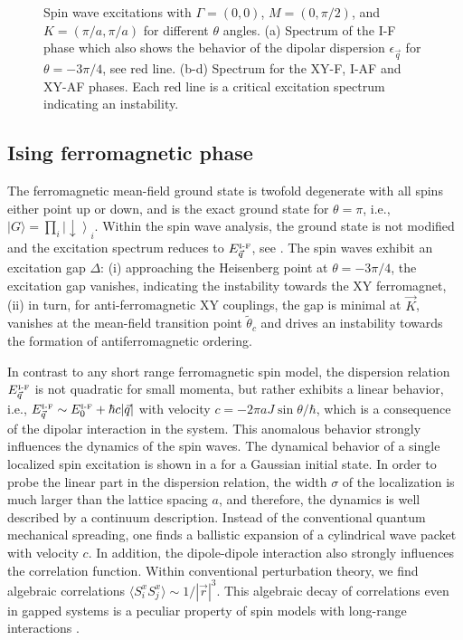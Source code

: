 \begin{figure}[ht]
    \centering
    \caption{Spin wave excitations with $\Gamma=(0,0)$, $M=(0,\pi/2)$, and $K=(\pi/a,\pi/a)$ for different $\theta$ angles. (a) Spectrum of the I-F phase which also shows the behavior of the dipolar dispersion $\epsilon_{\vec q}$ for $\theta=-3\pi/4$, see red line. (b-d) Spectrum for the XY-F, I-AF and XY-AF phases. Each red line is a critical excitation spectrum indicating an instability.}
\end{figure}



\subsection{Ising ferromagnetic phase}
The ferromagnetic mean-field ground state is twofold degenerate with all spins
either point up or down, and is the exact ground state for $\theta =
\pi$, i.e., $|G\rangle = \prod_{i} \left|\downarrow \right\rangle_{i}$. Within the spin wave analysis,
the ground state is not modified and the excitation
spectrum reduces to $E_{{\vec q}}^{\mbox{\tiny I-F}}$, see .
The spin waves exhibit an excitation gap $\Delta$: (i) approaching the
Heisenberg point at $\theta = -3 \pi /4$, the excitation gap
vanishes, indicating the instability towards the XY ferromagnet, (ii) in
turn, for anti-ferromagnetic XY couplings, the gap is minimal at ${\vec K}$,
vanishes at the mean-field transition point $\tilde{\theta}_{c}$ and drives an instability towards the formation
of antiferromagnetic ordering.

In contrast to any short range ferromagnetic spin model, the
dispersion relation $E_{{\vec q}}^{\mbox{\tiny I-F}}$ is not quadratic for small momenta,
but rather exhibits a linear behavior, i.e., $E_{{\vec q}}^{\mbox{\tiny I-F}} \sim E_{0}^{\mbox{\tiny I-F}}+ \hbar c |{\vec q}|$ with
velocity $c= - 2 \pi a J \sin \theta /\hbar$, which is a consequence of the dipolar interaction in
the system. This anomalous behavior strongly influences the dynamics
of the spin waves.
The dynamical behavior of a single localized spin excitation is shown in a for a Gaussian initial state.
In order to probe the linear part in the dispersion relation, the width $\sigma$
of the localization is much larger than the lattice spacing $a$, and therefore, the dynamics is
well described by a continuum description.
Instead of the conventional quantum mechanical spreading, one finds
a ballistic expansion of a cylindrical wave packet with velocity $c$.
In addition, the dipole-dipole interaction also strongly influences the correlation function.
Within conventional perturbation theory, we find algebraic correlations $\langle S_{i}^{x} S_{j}^{x}\rangle \sim 1/|{\vec r}|^3$.
This algebraic decay of correlations even in gapped systems is a peculiar property of
spin models with long-range interactions \cite{Deng2005,Schuch2006}.



